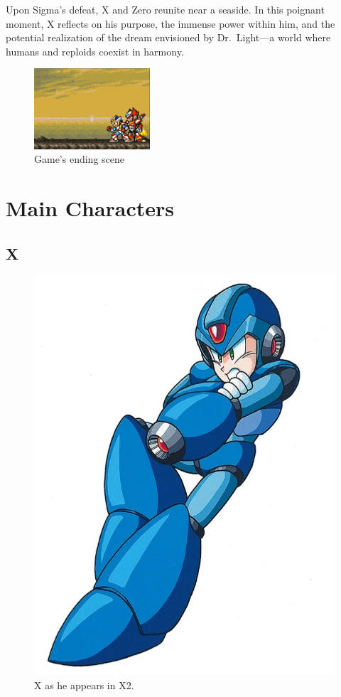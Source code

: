 Upon Sigma's defeat, X and Zero reunite near a seaside. In this poignant moment, X reflects on his purpose, the immense power within him, and the potential realization of the dream envisioned by Dr.~Light—a world where humans and reploids coexist in harmony.

\begin{figure}[htp]
	\centering
	\includegraphics[height=3cm]{figures/X2/Ending.jpg}
	\caption{Game's ending scene}
\end{figure}
\section{Main Characters}

\subsection{X}

\begin{figure}[htp]
	\centering
	\includegraphics[height=\portraitsize]{figures/X2/X.png}
	\caption{X as he appears in X2.}
\end{figure}

